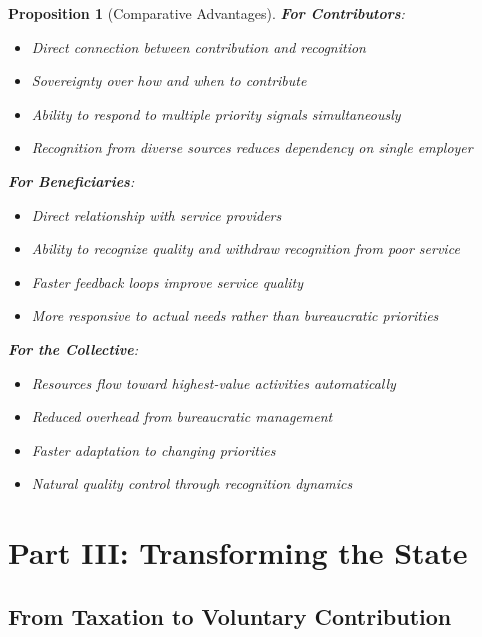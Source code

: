 \documentclass[11pt]{article}
\newtheorem{proposition}{Proposition}
\begin{document}
\begin{proposition}[Comparative Advantages]
\textbf{For Contributors}:
\begin{itemize}
\item Direct connection between contribution and recognition
\item Sovereignty over how and when to contribute
\item Ability to respond to multiple priority signals simultaneously
\item Recognition from diverse sources reduces dependency on single employer
\end{itemize}

\textbf{For Beneficiaries}:
\begin{itemize}
\item Direct relationship with service providers
\item Ability to recognize quality and withdraw recognition from poor service
\item Faster feedback loops improve service quality
\item More responsive to actual needs rather than bureaucratic priorities
\end{itemize}

\textbf{For the Collective}:
\begin{itemize}
\item Resources flow toward highest-value activities automatically
\item Reduced overhead from bureaucratic management
\item Faster adaptation to changing priorities
\item Natural quality control through recognition dynamics
\end{itemize}
\end{proposition}

\section{Part III: Transforming the State}

\subsection{From Taxation to Voluntary Contribution}
\end{document}
